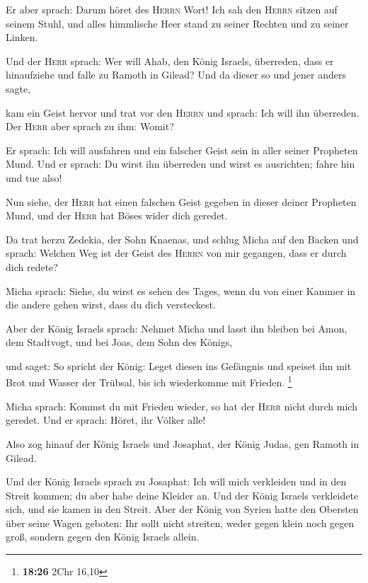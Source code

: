 Er aber sprach: Darum höret des \textsc{Herrn} Wort! Ich
sah den \textsc{Herrn} sitzen auf seinem Stuhl, und alles himmlische
Heer stand zu seiner Rechten und zu seiner Linken.

 Und der \textsc{Herr} sprach: Wer will Ahab, den König
Israels, überreden, dass er hinaufziehe und falle zu Ramoth in Gilead?
Und da dieser so und jener anders sagte,

 kam ein Geist hervor und trat vor den \textsc{Herrn} und
sprach: Ich will ihn überreden. Der \textsc{Herr} aber sprach zu ihm:
Womit?

 Er sprach: Ich will ausfahren und ein falscher Geist
sein in aller seiner Propheten Mund. Und er sprach: Du wirst ihn
überreden und wirst es ausrichten; fahre hin und tue also!

 Nun siehe, der \textsc{Herr} hat einen falschen Geist
gegeben in dieser deiner Propheten Mund, und der \textsc{Herr} hat Böses
wider dich geredet.

 Da trat herzu Zedekia, der Sohn Knaenas, und schlug
Micha auf den Backen und sprach: Welchen Weg ist der Geist des
\textsc{Herrn} von mir gegangen, dass er durch dich redete?

 Micha sprach: Siehe, du wirst es sehen des Tages, wenn
du von einer Kammer in die andere gehen wirst, dass du dich versteckest.

 Aber der König Israels sprach: Nehmet Micha und lasst
ihn bleiben bei Amon, dem Stadtvogt, und bei Joas, dem Sohn des Königs,

 und saget: So spricht der König: Leget diesen ins
Gefängnis und speiset ihn mit Brot und Wasser der Trübsal, bis ich
wiederkomme mit Frieden. \footnote{\textbf{18:26} 2Chr 16,10}

 Micha sprach: Kommst du mit Frieden wieder, so hat der
\textsc{Herr} nicht durch mich geredet. Und er sprach: Höret, ihr Völker
alle!

 Also zog hinauf der König Israels und Josaphat, der
König Judas, gen Ramoth in Gilead.

 Und der König Israels sprach zu Josaphat: Ich will mich
verkleiden und in den Streit kommen; du aber habe deine Kleider an. Und
der König Israels verkleidete sich, und sie kamen in den Streit.
 Aber der König von Syrien hatte den Obersten über seine
Wagen geboten: Ihr sollt nicht streiten, weder gegen klein noch gegen
groß, sondern gegen den König Israels allein.

